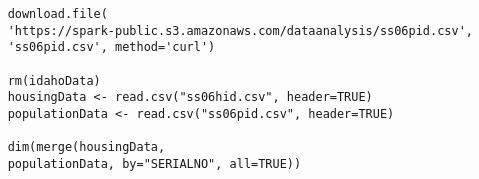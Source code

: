 \documentclass{beamer}
\begin{document}
\begin{frame}[fragile]
\begin{framed} 
	\begin{verbatim}
	download.file(
	'https://spark-public.s3.amazonaws.com/dataanalysis/ss06pid.csv',
	'ss06pid.csv', method='curl')
	
	rm(idahoData)
	housingData <- read.csv("ss06hid.csv", header=TRUE)
	populationData <- read.csv("ss06pid.csv", header=TRUE)
	
	dim(merge(housingData, 
	populationData, by="SERIALNO", all=TRUE))
	\end{verbatim}
\end{framed} 

\end{frame}
\end{document}
